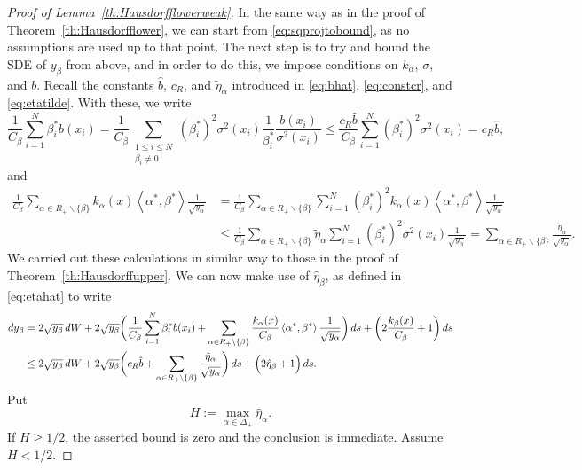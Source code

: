 \documentclass{article}
\numberwithin{equation}{section}
\newcommand{\inner}[2]{\left<#1,#2\right>}
\newcommand{\aR}{\alpha\in R_+}
\newcommand{\SaRnb}{\sum_{\aR\backslash\{\beta\}}}
\newcommand{\Sni}{\sum_{i=1}^N}
\theoremstyle{plain}
\begin{document}
    \begin{proof}[Proof of Lemma~\ref{th:Hausdorfflowerweak}]
        In the same way as in the proof of Theorem~\ref{th:Hausdorfflower}, we can start from \eqref{eq:sqprojtobound}, as no assumptions are used up to that point. The next step is to try and bound the SDE of $y_\beta$ from above, and in order to do this, we impose conditions on $k_\alpha$, $\sigma$, and $b$. 
        Recall the constants $\hat b$, $c_R$, and $\tilde\eta_\alpha$ introduced in \eqref{eq:bhat}, \eqref{eq:constcr}, and \eqref{eq:etatilde}. With these, we write
        \[\frac{1}{C_\beta}\Sni\beta_i^*b(x_i)=\frac{1}{C_\beta}\sum_{\substack{1\leq i\leq N\\\beta_i\ne0}}(\beta_i^*)^2\sigma^2(x_i)\frac{1}{\beta_i^*}\frac{b(x_i)}{\sigma^2(x_i)}\leq \frac{c_R\hat{b}}{C_\beta}\Sni(\beta_i^*)^2\sigma^2(x_i)=c_R\hat{b},\]
        and
        \begin{align*}
            \frac{1}{C_\beta}\SaRnb k_\alpha(x)\inner{\alpha^*}{\beta^*}\frac{1}{\sqrt{y_\alpha}}&=\frac1{C_\beta}\SaRnb \Sni(\beta_i^*)^2k_\alpha(x)\inner{\alpha^*}{\beta^*}\frac{1}{\sqrt{y_\alpha}}\\
            &\leq \frac1{C_\beta}\SaRnb \tilde{\eta}_\alpha\Sni(\beta_i^*)^2\sigma^2(x_i)\frac{1}{\sqrt{y_\alpha}}=\SaRnb \frac{\tilde{\eta}_\alpha}{\sqrt{y_\alpha}}.
        \end{align*}
        We carried out these calculations in similar way to those in the proof of Theorem~\ref{th:Hausdorffupper}.
        We can now make use of $\hat\eta_\beta$, as defined in \eqref{eq:etahat} to write
        \begin{align}
            dy_\beta &= 2\sqrt{y_\beta}\, dW+2\sqrt{y_\beta}\bigg(\frac{1}{C_\beta}\Sni\beta_i^*b(x_i)+\SaRnb \frac{k_\alpha(x)}{C_\beta}\inner{\alpha^*}{\beta^*}\frac{1}{\sqrt{y_\alpha}}\bigg)\, ds +\bigg(2\frac{k_\beta(x)}{C_\beta}+1\bigg)\,ds\label{eq:ybeta:stime}\\
            &\leq 2\sqrt{y_\beta}\, dW+2\sqrt{y_\beta}\bigg(c_R\hat{b}+\SaRnb \frac{\tilde{\eta}_\alpha}{\sqrt{y_\alpha}}\bigg)\, ds +\Big(2\hat{\eta}_\beta+1\Big)\,ds.\notag
        \end{align}
        Put \[
 H:=\max_{\alpha\in\Delta_+}\hat\eta_\alpha.
\]
If $H\geq1/2$, the asserted bound is zero and the conclusion is immediate. Assume $H<1/2$.


\end{proof}
\end{document}
